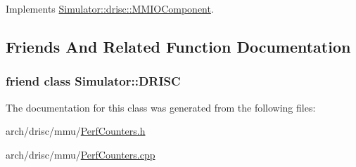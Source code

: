 Implements \hyperlink{class_simulator_1_1drisc_1_1_m_m_i_o_component_aab3662058e7a00109b122a1460188a8b}{Simulator\+::drisc\+::\+M\+M\+I\+O\+Component}.



\subsection{Friends And Related Function Documentation}
\hypertarget{class_simulator_1_1drisc_1_1_perf_counters_a14f94eb83e17d9d8841f39b37431d673}{
\subsubsection[{Simulator\+::\+D\+R\+I\+S\+C}]{\setlength{\rightskip}{0pt plus 5cm}friend class {\bf Simulator\+::\+D\+R\+I\+S\+C}\hspace{0.3cm}{\ttfamily [friend]}}}\label{class_simulator_1_1drisc_1_1_perf_counters_a14f94eb83e17d9d8841f39b37431d673}


The documentation for this class was generated from the following files\+:\begin{DoxyCompactItemize}
\item 
arch/drisc/mmu/\hyperlink{_perf_counters_8h}{Perf\+Counters.\+h}\item 
arch/drisc/mmu/\hyperlink{_perf_counters_8cpp}{Perf\+Counters.\+cpp}\end{DoxyCompactItemize}
